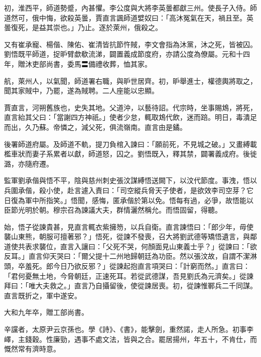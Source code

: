 \begin{pinyinscope}
 初，淮西平，師道勢蹙，內甚懼。李公度與大將李英曇都獻三州。使長子入侍。師道然可，俄中悔，欲殺英曇，賈直言諷師道嬖奴曰：「高沐冤氣在天，禍且至。英曇復死，是益其崇也。」乃止。逐於萊州，俄殺之。



 又有崔承寵、楊偕、陳佑、崔清皆抗節忤賊，李文會指為沐黨，沐之死，皆被囚。劉悟既平師道，捉昈臂歔欷流涕，闢置義成節度府，亦請公度為僚屬。元和十四年，贈沐吏部尚書，委馬〓備禮收葬，恤其家。



 航，萊州人，以氣聞，師道署右職，與昈世居齊。初，昈舉進士，權德輿將取之，聞其家賊中，乃罷，遂為賊聘。二人座能以忠顯。



 賈直言，河朔舊族也，史失其地。父道沖，以藝待詔。代宗時，坐事賜鴆，將死，直言紿其父曰：「當謝四方神祇。」使者少怠，輒取鴆代飲，迷而踣。明日，毒潰足而出，久乃蘇。帝憐之，減父死，俱流嶺南。直言由是鐍。



 後署師道府屬。及師道不軌，提刀負棺入諫曰：「願前死，不見城之破。」又畫縛載檻車狀而妻子系累者以獻，師道怒，囚之。劉悟既入，釋其禁，闢署義成府。後徙潞，亦隨府遷。



 監軍劉承偕與悟不平，陰與慈州刺史張汶謀縛悟送闕下，以汶代節度。事洩，悟以兵圍承偕，殺小使，赴言遽入責曰：「司空縱兵脅天子使者，是欲效李司空芽？它日復為軍中所指笑。」悟聞，感悔，匿承偕於第以免。悟每有過，必爭，故悟能以臣節光明於朝。穆宗召為諫議大夫，群情灑然稱允。而悟固留，得聽。



 始，悟子從諫貴甚，見直言輒衣紫擁笏，以兵自衛。直言諫悟曰：「郎少年，毋使襲山東熊，朝服可擅著邪？」悟死，從諫不發喪，召大將劉武德等矯悟遺言，與鄰道使共表求襲位，直言入讓曰：「父死不哭，何顏面見山東義士乎？」從諫曰：「欲反耳。」直言仰天哭曰：「爾父提十二州地歸朝廷為功臣。然以張汶故，自謂不潔淋頭，卒羞死。郎今日乃欲反邪？」從諫起抱直言項哭曰：「計窮而然。」直言曰：「君何憂無土地，今脅朝廷，正速死耳。若從武德謀，吾見劉氏為元濟矣。」從諫拜曰：「唯大夫救之。」直言乃自攝留後，使從諫居喪。初，從諫惟鄆兵二千同謀。直言既折之，軍中遂安。



 大和九年卒，贈工部尚書。



 辛讜者，太原尹云京孫也。學《詩》、《書》，能擊劍，重然諾，走人所急。初事李嶧，主錢穀。性廉勁，遇事不處文法，皆與之合。罷居揚州，年五十，不肯仕，而慨然常有濟時意。




\end{pinyinscope}
